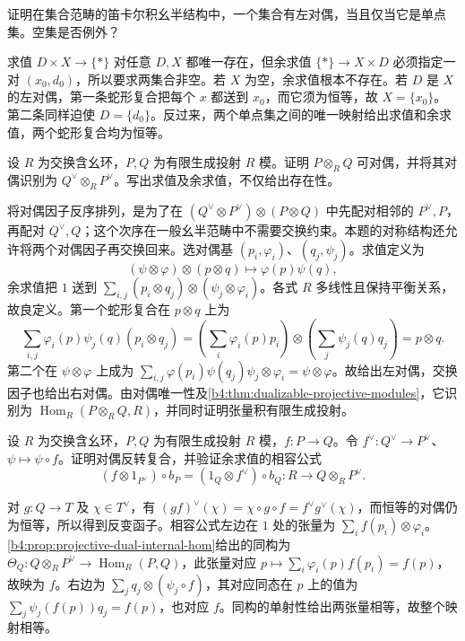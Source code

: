 \begin{exercise}\label{b4:ex:cartesian-dualizable-sets}
	证明在集合范畴的笛卡尔积幺半结构中，一个集合有左对偶，当且仅当它是单点集。空集是否例外？
\end{exercise}
\begin{solution}
	求值 \(D\times X\to\{*\}\) 对任意 \(D,X\) 都唯一存在，但余求值 \(\{*\}\to X\times D\) 必须指定一对 \((x_0,d_0)\)，所以要求两集合非空。若 \(X\) 为空，余求值根本不存在。若 \(D\) 是 \(X\) 的左对偶，第一条蛇形复合把每个 \(x\) 都送到 \(x_0\)，而它须为恒等，故 \(X=\{x_0\}\)。第二条同样迫使 \(D=\{d_0\}\)。反过来，两个单点集之间的唯一映射给出求值和余求值，两个蛇形复合均为恒等。
\end{solution}

\begin{exercise}\label{b4:ex:dual-of-tensor-modules}
	设 \(R\) 为交换含幺环，\(P,Q\) 为有限生成投射 \(R\) 模。证明 \(P\otimes_RQ\) 可对偶，并将其对偶识别为 \(Q^\vee\otimes_RP^\vee\)。写出求值及余求值，不仅给出存在性。
\end{exercise}
\begin{solution}
	将对偶因子反序排列，是为了在 \((Q^\vee\otimes P^\vee)\otimes(P\otimes Q)\) 中先配对相邻的 \(P^\vee,P\)，再配对 \(Q^\vee,Q\)；这个次序在一般幺半范畴中不需要交换约束。本题的对称结构还允许将两个对偶因子再交换回来。选对偶基 \((p_i,\varphi_i)\)、\((q_j,\psi_j)\)。求值定义为
	\[
		(\psi\otimes\varphi)\otimes(p\otimes q)\longmapsto\varphi(p)\psi(q),
	\]
	余求值把 \(1\) 送到 \(\sum_{i,j}(p_i\otimes q_j)\otimes(\psi_j\otimes\varphi_i)\)。各式 \(R\) 多线性且保持平衡关系，故良定义。第一个蛇形复合在 \(p\otimes q\) 上为
	\[
		\sum_{i,j}\varphi_i(p)\psi_j(q)(p_i\otimes q_j) =\left(\sum_i\varphi_i(p)p_i\right)\otimes \left(\sum_j\psi_j(q)q_j\right)=p\otimes q.
	\]
	第二个在 \(\psi\otimes\varphi\) 上成为 \(\sum_{i,j}\varphi(p_i)\psi(q_j)\psi_j\otimes\varphi_i=\psi\otimes\varphi\)。故给出左对偶，交换因子也给出右对偶。由对偶唯一性及\cref{b4:thm:dualizable-projective-modules}，它识别为 \(\operatorname{Hom}_R(P\otimes_RQ,R)\)，并同时证明张量积有限生成投射。
\end{solution}

\begin{exercise}\label{b4:ex:dual-morphism-compatibility}
	设 \(R\) 为交换含幺环，\(P,Q\) 为有限生成投射 \(R\) 模，\(f:P\to Q\)。令 \(f^\vee:Q^\vee\to P^\vee\)、\(\psi\mapsto\psi\circ f\)。证明对偶反转复合，并验证余求值的相容公式
	\[
		(f\otimes1_{P^\vee})\circ b_P =(1_Q\otimes f^\vee)\circ b_Q:R\longrightarrow Q\otimes_RP^\vee.
	\]
\end{exercise}
\begin{solution}
	对 \(g:Q\to T\) 及 \(\chi\in T^\vee\)，有 \((gf)^\vee(\chi)=\chi\circ g\circ f=f^\vee g^\vee(\chi)\)，而恒等的对偶仍为恒等，所以得到反变函子。相容公式左边在 \(1\) 处的张量为 \(\sum_i f(p_i)\otimes\varphi_i\)。\cref{b4:prop:projective-dual-internal-hom}给出的同构为 \(\Theta_Q:Q\otimes_RP^\vee\to\operatorname{Hom}_R(P,Q)\)，此张量对应 \(p\mapsto\sum_i\varphi_i(p)f(p_i)=f(p)\)，故映为 \(f\)。右边为 \(\sum_jq_j\otimes(\psi_j\circ f)\)，其对应同态在 \(p\) 上的值为 \(\sum_j\psi_j(f(p))q_j=f(p)\)，也对应 \(f\)。同构的单射性给出两张量相等，故整个映射相等。
\end{solution}

